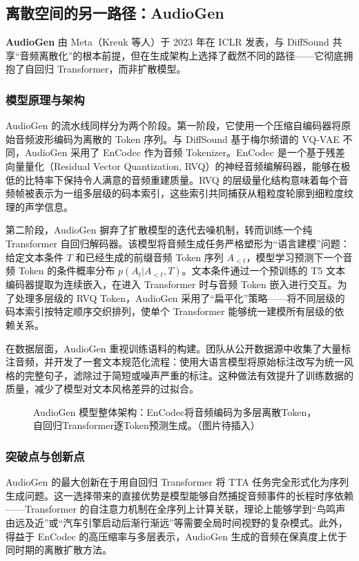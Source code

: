 \documentclass[12pt,a4paper]{article}
\begin{document}
\subsection{离散空间的另一路径：AudioGen}

\textbf{AudioGen} 由 Meta（Kreuk 等人）于 2023 年在 ICLR 发表，与 DiffSound 共享“音频离散化”的根本前提，但在生成架构上选择了截然不同的路径——它彻底拥抱了自回归 Transformer，而非扩散模型。

\subsubsection{模型原理与架构}
AudioGen 的流水线同样分为两个阶段。第一阶段，它使用一个压缩自编码器将原始音频波形编码为离散的 Token 序列。与 DiffSound 基于梅尔频谱的 VQ-VAE 不同，AudioGen 采用了 EnCodec 作为音频 Tokenizer。EnCodec 是一个基于残差向量量化（Residual Vector Quantization, RVQ）的神经音频编解码器，能够在极低的比特率下保持令人满意的音频重建质量。RVQ 的层级量化结构意味着每个音频帧被表示为一组多层级的码本索引，这些索引共同捕获从粗粒度轮廓到细粒度纹理的声学信息。

第二阶段，AudioGen 摒弃了扩散模型的迭代去噪机制，转而训练一个纯 Transformer 自回归解码器。该模型将音频生成任务严格塑形为“语言建模”问题：给定文本条件 \(T\) 和已经生成的前缀音频 Token 序列 \(A_{<t}\)，模型学习预测下一个音频 Token 的条件概率分布 \(p(A_t | A_{<t}, T)\)。文本条件通过一个预训练的 T5 文本编码器提取为连续嵌入，在进入 Transformer 时与音频 Token 嵌入进行交互。为了处理多层级的 RVQ Token，AudioGen 采用了“扁平化”策略——将不同层级的码本索引按特定顺序交织排列，使单个 Transformer 能够统一建模所有层级的依赖关系。

在数据层面，AudioGen 重视训练语料的构建。团队从公开数据源中收集了大量标注音频，并开发了一套文本规范化流程：使用大语言模型将原始标注改写为统一风格的完整句子，滤除过于简短或噪声严重的标注。这种做法有效提升了训练数据的质量，减少了模型对文本风格差异的过拟合。

\begin{figure}[htbp]
\centering
{}
\caption{AudioGen 模型整体架构：EnCodec将音频编码为多层离散Token，自回归Transformer逐Token预测生成。（图片待插入）}
\label{fig:audiogen}
\end{figure}

\subsubsection{突破点与创新点}
AudioGen 的最大创新在于用自回归 Transformer 将 TTA 任务完全形式化为序列生成问题。这一选择带来的直接优势是模型能够自然捕捉音频事件的长程时序依赖——Transformer 的自注意力机制在全序列上计算关联，理论上能够学到“鸟鸣声由远及近”或“汽车引擎启动后渐行渐远”等需要全局时间视野的复杂模式。此外，得益于 EnCodec 的高压缩率与多层表示，AudioGen 生成的音频在保真度上优于同时期的离散扩散方法。
\end{document}
